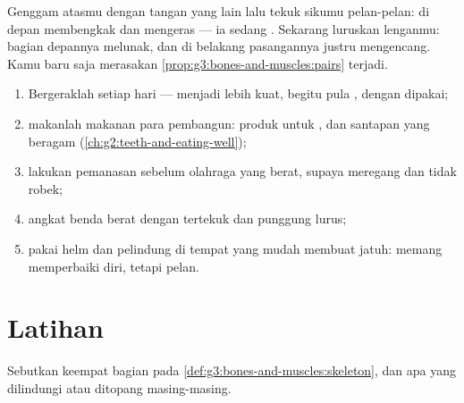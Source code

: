 \begin{example}\label{ex:g3:bones-and-muscles:pair}
Genggam  atasmu dengan tangan yang lain lalu tekuk sikumu
pelan-pelan:  di depan membengkak dan mengeras --- ia sedang
. Sekarang luruskan lenganmu: bagian depannya melunak, dan
di belakang  pasangannya justru mengencang. Kamu baru saja
merasakan \cref{prop:g3:bones-and-muscles:pairs} terjadi.
\end{example}

\begin{method}\label{met:g3:bones-and-muscles:care}
\begin{enumerate}
  \item Bergeraklah setiap hari ---  menjadi lebih kuat, begitu
        pula , dengan dipakai;
  \item makanlah makanan para pembangun: produk  untuk , dan
        santapan yang beragam (\cref{ch:g2:teeth-and-eating-well});
  \item lakukan pemanasan sebelum olahraga yang berat, supaya 
        meregang dan tidak robek;
  \item angkat benda berat dengan  tertekuk dan punggung lurus;
  \item pakai helm dan pelindung di tempat yang mudah membuat jatuh:
         memang memperbaiki diri, tetapi pelan.
\end{enumerate}
\end{method}

\section{Latihan}

\begin{exercise}[$\star$]\label{exo:g3:bones-and-muscles:1}
Sebutkan keempat bagian  pada
\cref{def:g3:bones-and-muscles:skeleton}, dan apa yang dilindungi atau
ditopang masing-masing.
\end{exercise}

